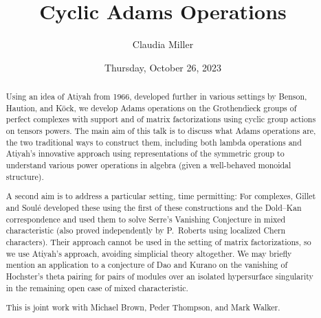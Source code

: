 \documentclass{UAmathtalk}
\author{Claudia Miller}
\title{Cyclic Adams Operations}
\date{Thursday, October 26, 2023}
\begin{document}
\maketitle

\begin{abstract}
Using an idea of Atiyah from 1966, developed further in various settings by Benson, Haution, and Köck, we develop Adams operations on the Grothendieck groups of perfect complexes with support and of matrix factorizations using cyclic group actions on tensors powers. The main aim of this talk is to discuss what Adams operations are, the two traditional ways to construct them, including both lambda operations and Atiyah’s innovative approach using representations of the symmetric group to understand various power operations in algebra (given a well-behaved monoidal structure).

A second aim is to address a particular setting, time permitting: For complexes, Gillet and Soulé developed these using the first of these constructions and the Dold–Kan correspondence and used them to solve Serre’s Vanishing Conjecture in mixed characteristic (also proved independently by P.~Roberts using localized Chern characters). Their approach cannot be used in the setting of matrix factorizations, so we use Atiyah’s approach, avoiding simplicial theory altogether. We may briefly mention an application to a conjecture of Dao and Kurano on the vanishing of Hochster’s theta pairing for pairs of modules over an isolated hypersurface singularity in the remaining open case of mixed characteristic.

This is joint work with Michael Brown, Peder Thompson, and Mark Walker.
\end{abstract}
\end{document}
